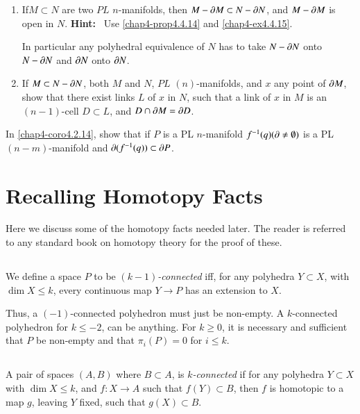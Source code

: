 \begin{ex}\label{chap4-ex4.4.17}
\begin{enumerate}
\renewcommand{\labelenumi}{(\theenumi)}
\item If\pageoriginale $M\subset N$ are two $PL$ $n$-manifolds, then $M-\partial M\subset N-\partial N$, and $M-\partial M$ is open in $N$.
\noindent
{\bf Hint:}~ Use \ref{chap4-prop4.4.14} and \ref{chap4-ex4.4.15}.

In particular any polyhedral equivalence of $N$ has to take $N-\partial N$ onto $N-\partial N$ and $\partial N$ onto $\partial N$.

\item If $M\subset N-\partial N$, both $M$ and $N$, $PL$ $(n)$-manifolds, and $x$ any point of $\partial M$, show that there exist links $L$ of $x$ in $N$, such that a link of $x$ in $M$ is an $(n-1)$-cell $D\subset L$, and $D\cap \partial M=\partial D$.
\end{enumerate}
\end{ex}

\begin{ex}\label{chap4-ex4.4.18}
In \ref{chap4-coro4.2.14}, show that if $P$ is a PL $n$-manifold $f^{-1}(q)(\partial\neq \emptyset)$ is a PL $(n-m)$-manifold and $\partial (f^{-1}(q))\subset \partial P$.
\end{ex}

\section{Recalling Homotopy Facts}\label{chap4-sec4.5}

Here we discuss some of the homotopy facts needed later. The reader is referred to any standard book on homotopy theory for the proof of these.

\subsection{}\label{chap4-sec4.5.1}
We define a space $P$ to be {\em $(k-1)$-connected} iff, for any polyhedra $Y\subset X$, with $\dim X\leq k$, every continuous map $Y\to P$ has an extension to $X$.

Thus, a $(-1)$-connected polyhedron must just be non-empty. A $k$-connected polyhedron for $k\leq -2$, can be anything. For $k\geq 0$, it is necessary and sufficient that $P$ be non-empty and that $\pi_{i}(P)=0$ for $i\leq k$.

\subsection{}\label{chap4-sec4.5.2}
A pair of spaces $(A,B)$ where $B\subset A$, is {\em $k$-connected} if for any polyhedra $Y\subset X$ with $\dim X\leq k$, and $f:X\to A$ such that $f(Y)\subset B$, then $f$ is homotopic to a map $g$, leaving $Y$ fixed, such that $g(X)\subset B$.

